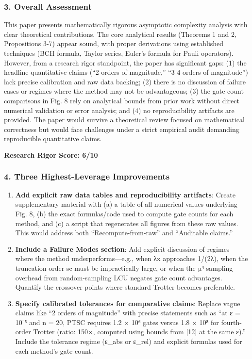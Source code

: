 \documentclass[10pt,letterpaper]{article}
\begin{document}
\hypertarget{overall-assessment}{%
\subsubsection{3. Overall Assessment}\label{overall-assessment}}

This paper presents mathematically rigorous asymptotic complexity analysis with clear theoretical contributions. The core analytical results (Theorems 1 and 2, Propositions 3-7) appear sound, with proper derivations using established techniques (BCH formula, Taylor series, Euler's formula for Pauli operators). However, from a research rigor standpoint, the paper has significant gaps: (1) the headline quantitative claims (``2 orders of magnitude,'' ``3-4 orders of magnitude'') lack precise calibration and raw data backing; (2) there is no discussion of failure cases or regimes where the method may not be advantageous; (3) the gate count comparisons in Fig. 8 rely on analytical bounds from prior work without direct numerical validation or error analysis; and (4) no reproducibility artifacts are provided. The paper would survive a theoretical review focused on mathematical correctness but would face challenges under a strict empirical audit demanding reproducible quantitative claims.

\textbf{Research Rigor Score: 6/10}

\hypertarget{three-highest-leverage-improvements}{%
\subsubsection{4. Three Highest-Leverage Improvements}\label{three-highest-leverage-improvements}}

\begin{enumerate}
\def\labelenumi{\arabic{enumi}.}
\item
  \textbf{Add explicit raw data tables and reproducibility artifacts}: Create supplementary material with (a) a table of all numerical values underlying Fig. 8, (b) the exact formulas/code used to compute gate counts for each method, and (c) a script that regenerates all figures from these raw values. This would address both ``Recompute-from-raw'' and ``Auditable claims.''
\item
  \textbf{Include a Failure Modes section}: Add explicit discussion of regimes where the method underperforms---e.g., when λx approaches 1/(2λ), when the truncation order sc must be impractically large, or when the µ⁴ sampling overhead from random-sampling LCU negates gate count advantages. Quantify the crossover points where standard Trotter becomes preferable.
\item
  \textbf{Specify calibrated tolerances for comparative claims}: Replace vague claims like ``2 orders of magnitude'' with precise statements such as ``at ε = 10⁻⁵ and n = 20, PTSC requires 1.2 × 10⁶ gates versus 1.8 × 10⁸ for fourth-order Trotter (ratio: 150×, computed using bounds from {[}12{]} at the same ε).'' Include the tolerance regime (ε\_abs or ε\_rel) and explicit formulas used for each method's gate count.
\end{enumerate}
\end{document}
